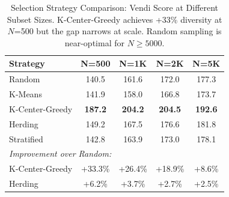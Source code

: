 \begin{table}[t]
\centering
\caption{Selection Strategy Comparison: Vendi Score at Different Subset Sizes. K-Center-Greedy achieves +33\% diversity at $N$=500 but the gap narrows at scale. Random sampling is near-optimal for $N \geq 5000$.}
\label{tab:selection_strategies}
\begin{tabular}{lcccc}
\toprule
\textbf{Strategy} & \textbf{N=500} & \textbf{N=1K} & \textbf{N=2K} & \textbf{N=5K} \\
\midrule
Random & 140.5 & 161.6 & 172.0 & 177.3 \\
K-Means & 141.9 & 158.0 & 166.8 & 173.7 \\
K-Center-Greedy & \textbf{187.2} & \textbf{204.2} & \textbf{204.5} & \textbf{192.6} \\
Herding & 149.2 & 167.5 & 176.6 & 181.8 \\
Stratified & 142.8 & 163.9 & 173.0 & 178.1 \\
\midrule
\multicolumn{5}{l}{\textit{Improvement over Random:}} \\
K-Center-Greedy & +33.3\% & +26.4\% & +18.9\% & +8.6\% \\
Herding & +6.2\% & +3.7\% & +2.7\% & +2.5\% \\
\bottomrule
\end{tabular}
\end{table}
